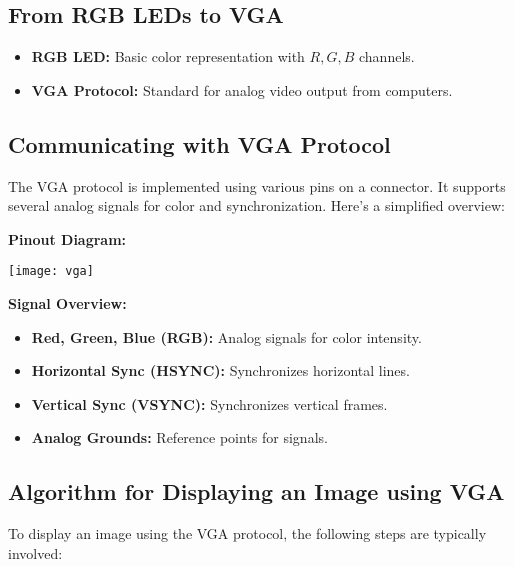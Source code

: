 
\subsection*{From RGB LEDs to VGA}
\begin{itemize}
    \item \textbf{RGB LED:} Basic color representation with \( R, G, B \) channels.
    \item \textbf{VGA Protocol:} Standard for analog video output from computers.
\end{itemize}

\subsection*{Communicating with VGA Protocol}

The VGA protocol is implemented using various pins on a connector. It supports several analog signals for color and synchronization. Here's a simplified overview:

\begin{minipage}[t]{0.5\textwidth}
    \textbf{Pinout Diagram:}
    \begin{center}
        \texttt{[image: vga]}
    \end{center}
\end{minipage}%
\begin{minipage}[t]{0.5\textwidth}
    \textbf{Signal Overview:}
    \begin{itemize}
        \item \textbf{Red, Green, Blue (RGB):} Analog signals for color intensity.
        \item \textbf{Horizontal Sync (HSYNC):} Synchronizes horizontal lines.
        \item \textbf{Vertical Sync (VSYNC):} Synchronizes vertical frames.
        \item \textbf{Analog Grounds:} Reference points for signals.
    \end{itemize}
\end{minipage}


\subsection*{Algorithm for Displaying an Image using VGA}

To display an image using the VGA protocol, the following steps are typically involved:

